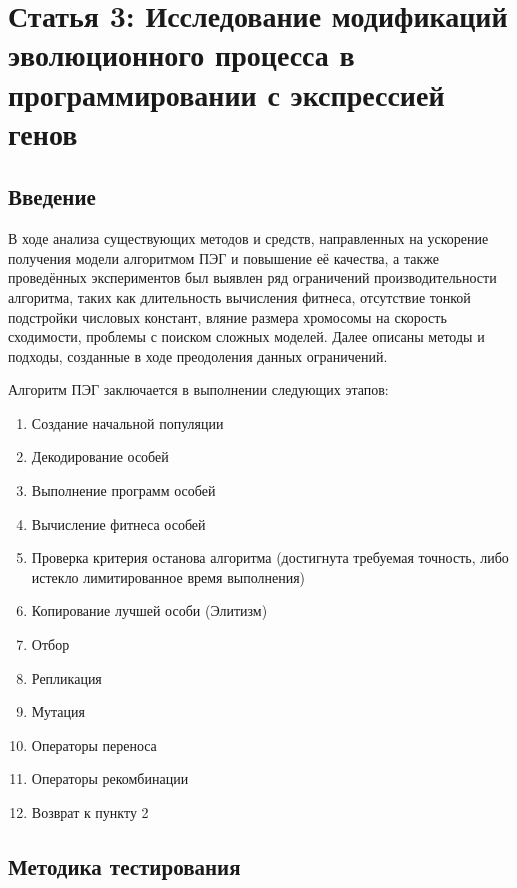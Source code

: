 \section{Статья 3: Исследование модификаций эволюционного процесса в программировании с экспрессией генов}

\subsection{Введение}

В ходе анализа существующих методов и средств, направленных на ускорение получения модели алгоритмом ПЭГ и повышение её качества, а также проведённых экспериментов был выявлен ряд ограничений производительности алгоритма, таких как длительность вычисления фитнеса, отсутствие тонкой подстройки числовых констант, вляние размера хромосомы на скорость сходимости, проблемы с поиском сложных моделей. Далее описаны методы и подходы, созданные в ходе преодоления данных ограничений.

Алгоритм ПЭГ заключается в выполнении следующих этапов:
\begin{enumerate} \itemsep0pt \parskip0pt 
  \item Создание начальной популяции
  \item Декодирование особей
  \item Выполнение программ особей
  \item Вычисление фитнеса особей
  \item Проверка критерия останова алгоритма (достигнута требуемая точность, либо истекло лимитированное время выполнения)
  \item Копирование лучшей особи (Элитизм)
  \item Отбор
  \item Репликация
  \item Мутация
  \item Операторы переноса
  \item Операторы рекомбинации
  \item Возврат к пункту 2
\end{enumerate}






\subsection{Методика тестирования}

